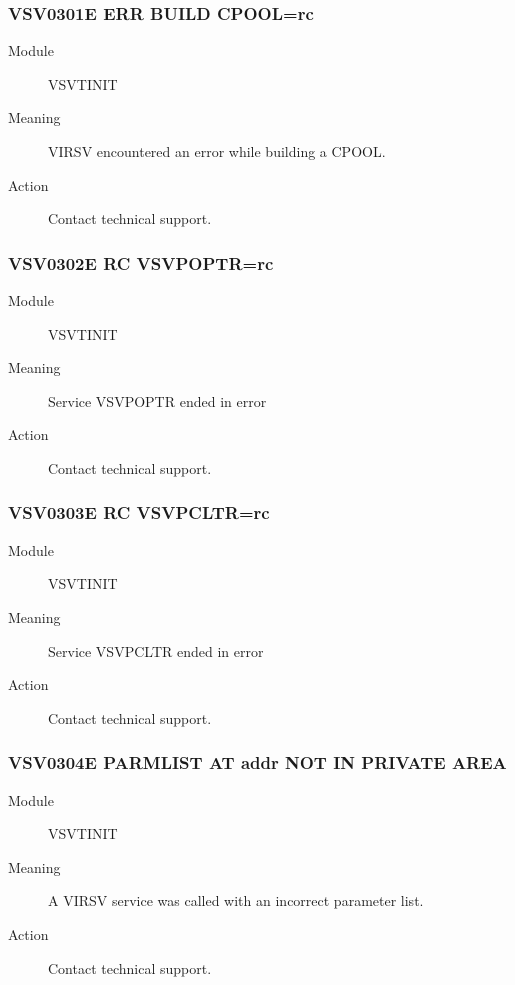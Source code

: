\documentclass[letterpaper,10pt,english]{sphinxmanual}
\begin{document}
\subsubsection{VSV0301E ERR BUILD CPOOL=rc}
\label{\detokenize{messages:vsv0301e-err-build-cpool-rc}}\begin{description}
\item[{Module}] \leavevmode
VSVTINIT

\item[{Meaning}] \leavevmode
VIRSV encountered an error while building a CPOOL.

\item[{Action}] \leavevmode
Contact technical support.

\end{description}


\subsubsection{VSV0302E RC VSVPOPTR=rc}
\label{\detokenize{messages:vsv0302e-rc-vsvpoptr-rc}}\begin{description}
\item[{Module}] \leavevmode
VSVTINIT

\item[{Meaning}] \leavevmode
Service VSVPOPTR ended in error

\item[{Action}] \leavevmode
Contact technical support.

\end{description}


\subsubsection{VSV0303E RC VSVPCLTR=rc}
\label{\detokenize{messages:vsv0303e-rc-vsvpcltr-rc}}\begin{description}
\item[{Module}] \leavevmode
VSVTINIT

\item[{Meaning}] \leavevmode
Service VSVPCLTR ended in error

\item[{Action}] \leavevmode
Contact technical support.

\end{description}


\subsubsection{VSV0304E PARMLIST AT addr NOT IN PRIVATE AREA}
\label{\detokenize{messages:vsv0304e-parmlist-at-addr-not-in-private-area}}\begin{description}
\item[{Module}] \leavevmode
VSVTINIT

\item[{Meaning}] \leavevmode
A VIRSV service was called with an incorrect parameter list.

\item[{Action}] \leavevmode
Contact technical support.

\end{description}
\end{document}
